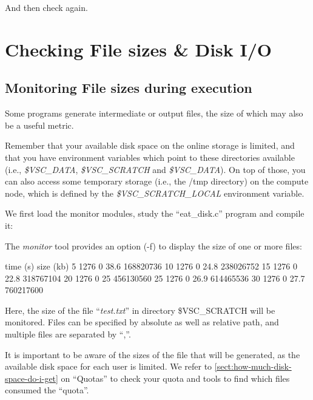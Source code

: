 And then check again.

\section{Checking File sizes \& Disk I/O}

\subsection{Monitoring File sizes during execution}

Some programs generate intermediate or output files, the size of which may also
be a useful metric.

Remember that your available disk space on the \hpc online storage is limited,
and that you have environment variables which point to these directories available
(i.e., \emph{\$VSC\_DATA}, \emph{\$VSC\_SCRATCH} and \emph{\$VSC\_DATA}).
On top of those, you can also access some temporary storage (i.e., the /tmp
directory) on the compute node, which is defined by the
\emph{\$VSC\_SCRATCH\_LOCAL} environment variable.

\ifgent
\else
  We first load the monitor modules, study the ``eat\_disk.c'' program and
  compile it:

\begin{prompt}
\end{prompt}

  The \emph{monitor} tool provides an option (-f) to display the size of one or
  more files:

\begin{prompt}
time (s) size (kb) %
5  1276  0 38.6 168820736
10  1276  0 24.8 238026752
15  1276  0 22.8 318767104
20  1276  0 25 456130560
25  1276  0 26.9 614465536
30  1276  0 27.7 760217600
\end{prompt}

  Here, the size of the file ``\emph{test.txt}'' in directory \$VSC\_SCRATCH will
  be monitored. Files can be specified by absolute as well as relative path, and
  multiple files are separated by ``,''.
\fi

It is important to be aware of the sizes of the file that will be generated, as
the available disk space for each user is limited.  We refer to \autoref{sect:how-much-disk-space-do-i-get} on
``Quotas'' to check your quota and tools to find which files consumed the
``quota''.

